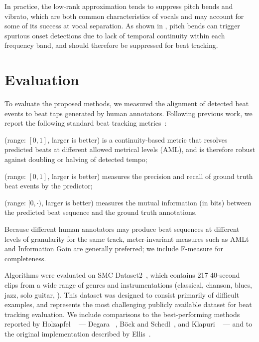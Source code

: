 \documentclass{article}
\begin{document}
In practice, the low-rank approximation tends to suppress pitch bends and vibrato,
which are both common characteristics of vocals and may account for some of its success
at vocal separation.  
As shown in , pitch bends can trigger spurious onset 
detections due to lack of temporal continuity within each frequency band, and should
therefore be suppressed for beat tracking.  

\section{Evaluation}
\label{sec:eval}

To evaluate the proposed methods, we measured the alignment of detected beat events to 
beat taps generated by human annotators.  Following previous work, we report the
following standard beat tracking metrics~\cite{davies2009evaluation}:
\begin{description}\addtolength{\itemsep}{-.75\baselineskip}
\item[AMLt] (range: $[0, 1]$, larger is better) is a continuity-based metric that
resolves predicted beats at different allowed metrical levels (AML), and is therefore 
robust against doubling or halving of detected tempo;
\item[F-measure] (range: $[0,1]$, larger is better) measures the precision and recall of ground truth beat events by the predictor; 
\item[Information gain] (range: $[0, \cdot)$, larger is better) measures the mutual information (in bits) between the predicted beat sequence and the ground truth annotations.
\end{description}
Because different human annotators may produce beat sequences at
different levels of granularity for the same track, meter-invariant measures such as
AMLt and Information Gain are generally preferred; we include F-measure for
completeness.

Algorithms were evaluated on SMC Dataset2~\cite{holzapfel2012}, which contains 217
40-second clips from a wide range of genres and instrumentations (classical, chanson, 
blues, jazz, solo guitar, \etc).  This dataset was designed to consist primarily of 
difficult examples, and represents the most challenging publicly available dataset for beat
tracking evaluation.  We include comparisons to the best-performing methods reported by
Holzapfel \etal~\cite{holzapfel2012} --- Degara \etal~\cite{degara2012reliability}, B\"{o}ck and Schedl~\cite{bock2011enhanced}, and
Klapuri \etal~\cite{klapuri2006analysis} --- and to the original implementation described by
Ellis~\cite{ellis2007beat}.
\end{document}
